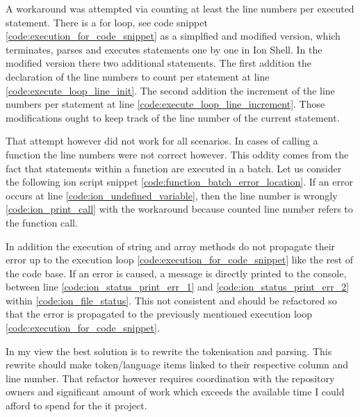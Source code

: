 A workaround was attempted via counting at least the line numbers per executed statement.
There is a for loop, see code snippet \ref{code:execution_for_code_snippet} as a simplfied and modified version,
which terminates, parses and executes statements one by one in Ion Shell.
In the modified version there two additional statements.
The first addition the declaration of the line numbers to count per statement at line \ref{code:execute_loop_line_init}.
The second addition the increment of the line numbers  per statement at line \ref{code:execute_loop_line_increment}.
Those modifications ought to keep track of the line number of the current statement.

\clearpage


That attempt however did not work for all scenarios.
In cases of calling a function the line numbers were not correct however.
This oddity comes from the fact that statements within a function are executed in a batch.
Let us consider the following ion script snippet \ref{code:function_batch_error_location}.
If an error occurs at line \ref{code:ion_undefined_variable},
then the line number is wrongly \ref{code:ion_print_call}
with the workaround because counted line number refers to the function call.

\clearpage


In addition the execution of string and array methods do not propagate their error up to the execution loop \ref{code:execution_for_code_snippet}
like the rest of the code base.
If an error is caused, a message is directly printed to the console,
between line \ref{code:ion_status_print_err_1} and \ref{code:ion_status_print_err_2} within \ref{code:ion_file_status}.
This not consistent and should be refactored so that the error is propagated
to the previously mentioned execution loop \ref{code:execution_for_code_snippet}.



In my view the best solution is to rewrite the tokenisation and parsing.
This rewrite should make token/language items linked to their respective column and line number.
That refactor however requires coordination with the repository owners and significant amount of work
which exceeds the available time I could afford to spend for the it project.

